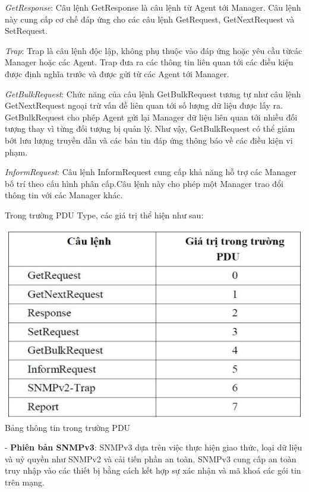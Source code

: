 \documentclass[12pt,oneside,a4paper,reqno]{report}
\begin{document}
\begin{large}
\textit{GetResponse}: Câu lệnh GetResponse là câu lệnh từ Agent tới Manager. Câu lệnh này cung cấp cơ chế đáp ứng cho các câu lệnh GetRequest, GetNextRequest và SetRequest. 

\textit{Trap}: Trap là câu lệnh độc lập, không phụ thuộc vào đáp ứng hoặc yêu cầu từcác Manager hoặc các Agent. Trap đưa ra các thông tin liên quan tới các điều kiện được định nghĩa trước và được gửi từ các Agent tới Manager. 

\textit{GetBulkRequest}: Chức năng của câu lệnh GetBulkRequest tương tự như câu lệnh GetNextRequest ngoại trừ vấn đề liên quan tới số lượng dữ liệu được lấy ra. GetBulkRequest cho phép Agent gửi lại Manager dữ liệu liên quan tới nhiều đối tượng thay vì từng đối tượng bị quản lý. Như vậy, GetBulkRequest có thể giảm bớt lưu lượng truyền dẫn và các bản tin đáp ứng thông báo về các điều kiện vi phạm.
 
\textit{InformRequest}: Câu lệnh InformRequest cung cấp khả năng hỗ trợ các Manager bố trí theo cấu hình phân cấp.Câu lệnh này cho phép một Manager trao đổi thông tin với các Manager khác. 

Trong trường PDU Type, các giá trị thể hiện như sau: \\

\begin{center}
	\includegraphics[scale=1]{images/snmpv2_2.jpg}\\
	Bảng thông tin trong trường PDU
\end{center}

- \textbf{Phiên bản SNMPv3}: SNMPv3 dựa trên việc thực hiện giao thức, loại dữ liệu và uỷ quyền như SNMPv2 và cải tiến phần an toàn. SNMPv3 cung cấp an toàn truy nhập vào các thiết bị bằng cách kết hợp sự xác nhận và mã khoá các gói tin trên mạng. 


\end{large}
\end{document}

